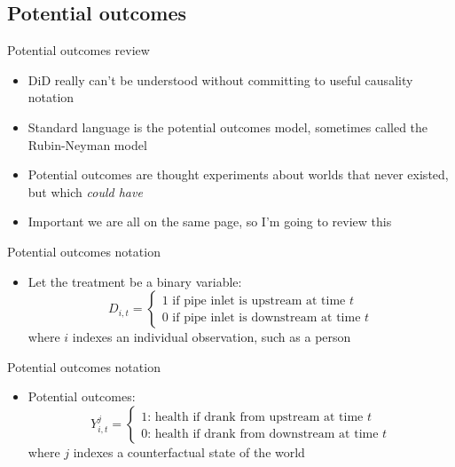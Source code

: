 \documentclass{beamer}
\begin{document}
\subsection{Potential outcomes}



\begin{frame}{Potential outcomes review}

\begin{itemize}
\item DiD really can't be understood without committing to useful causality notation
\item Standard language is the potential outcomes model, sometimes called the Rubin-Neyman model
\item Potential outcomes are thought experiments about worlds that never existed, but which \emph{could have}
\item Important we are all on the same page, so I'm going to review this
\end{itemize}

\end{frame}
\begin{frame}{Potential outcomes notation}
	
	\begin{itemize}
	\item Let the treatment be a binary variable: $$D_{i,t} =\begin{cases} 1 \text{ if pipe inlet is upstream at time $t$} \\ 0 \text{ if pipe inlet is downstream at time $t$} \end{cases}$$where $i$ indexes an individual observation, such as a person

	\end{itemize}
\end{frame}

\begin{frame}{Potential outcomes notation}
	
	\begin{itemize}

	\item Potential outcomes: $$Y_{i,t}^j =\begin{cases} 1 \text{: health if drank from upstream at time $t$} \\ 0 \text{: health if drank from downstream at time $t$} \end{cases}$$where $j$ indexes a counterfactual state of the world

	\end{itemize}
\end{frame}
\end{document}
